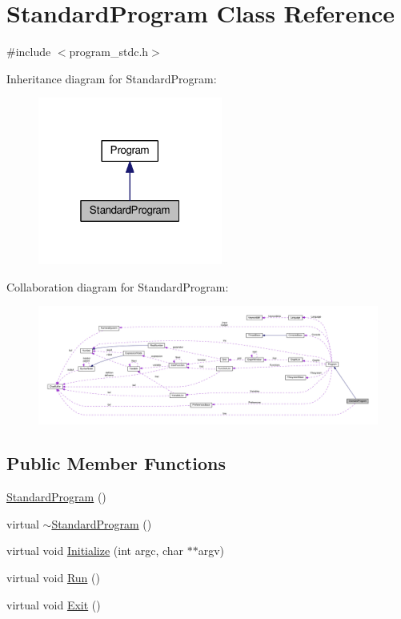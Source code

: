 \hypertarget{classStandardProgram}{}\section{Standard\+Program Class Reference}
\label{classStandardProgram}


{\ttfamily \#include $<$program\+\_\+stdc.\+h$>$}



Inheritance diagram for Standard\+Program\+:\nopagebreak
\begin{figure}[H]
\begin{center}
\leavevmode
\includegraphics[width=172pt]{classStandardProgram__inherit__graph}
\end{center}
\end{figure}


Collaboration diagram for Standard\+Program\+:\nopagebreak
\begin{figure}[H]
\begin{center}
\leavevmode
\includegraphics[width=350pt]{classStandardProgram__coll__graph}
\end{center}
\end{figure}
\subsection*{Public Member Functions}
\begin{DoxyCompactItemize}
\item 
\hyperlink{classStandardProgram_a8f86a2eaf4593fd52dc4d13c40815f05}{Standard\+Program} ()
\item 
virtual \hyperlink{classStandardProgram_a0951dd7180268e21085aa33914968984}{$\sim$\+Standard\+Program} ()
\item 
virtual void \hyperlink{classStandardProgram_a9e887904df28471bc3801384e5a1f151}{Initialize} (int argc, char $\ast$$\ast$argv)
\item 
virtual void \hyperlink{classStandardProgram_a71dce9fdccf23ac49ba2362dcae744d3}{Run} ()
\item 
virtual void \hyperlink{classStandardProgram_a1354fa2291bf56d90b7d46d841a02b8c}{Exit} ()
\end{DoxyCompactItemize}
